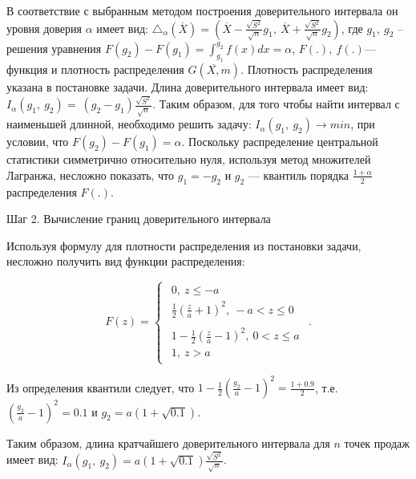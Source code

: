 \documentclass[addpoints, answers]{exam} %
\begin{document}
\begin{questions}
\begin{parts}
\begin{solution}
В соответствие с выбранным методом построения доверительного интервала он уровня доверия $\alpha $ имеет вид: ${\triangle }_{\alpha }\left(\overline{X}\right)=\left(\overline{X}-\frac{\sqrt{S^2}}{\sqrt{n}}g_1,\ \overline{X}+\frac{\sqrt{S^2}}{\sqrt{n}}g_2\right)$, где $g_1,\ g_2$ -- решения уравнения $F\left(g_2\right)-F\left(g_1\right)=\int^{g_2}_{g_1}{f\left(x\right)dx}=\alpha $, $F\left(.\right),\ f\left(.\right)$--- функция и плотность распределения $G\left(\overline{X,}m\right)$. Плотность распределения указана в постановке задачи. Длина доверительного интервала имеет вид:$I_{\alpha }\left(g_1,\ g_2\right)=\ \left(g_2-g_1\right)\frac{\sqrt{S^2}}{\sqrt{n}}$. Таким образом, для того чтобы найти интервал с наименьшей длинной, необходимо решить задачу: $I_{\alpha }\left(g_1,\ g_2\right)\to min$, при условии, что $F\left(g_2\right)-F\left(g_1\right)=\alpha $. Поскольку распределение центральной статистики симметрично относительно нуля, используя метод множителей Лагранжа, несложно показать, что  $g_1=-g_2$ и $g_2$ --- квантиль порядка $\frac{1+\alpha }{2}$ распределения $F\left(.\right)$.

Шаг 2. Вычисление границ доверительного интервала

Используя формулу для плотности распределения из постановки задачи, несложно получить вид функции распределения:

\[F\left(z\right)=\left\{ \begin{array}{c}
 \begin{array}{c}
0,\ z\le -a \\
\frac{1}{2}{\left(\frac{z}{a}+1\right)}^2,\ -a<z\le 0 \end{array}
 \\
 \begin{array}{c}
1-\frac{1}{2}{\left(\frac{z}{a}-1\right)}^2,\ 0<z\le a \\
1,\ z>a \end{array}
 \end{array}
\right..\]

Из определения квантили следует, что $1-\frac{1}{2}{\left(\frac{g_2}{a}-1\right)}^2=\frac{1+0.9}{2}$, т.е. ${\left(\frac{g_2}{a}-1\right)}^2=0.1$ и $g_2=a\left(1+\sqrt{0.1}\right)$.

Таким образом, длина кратчайшего доверительного интервала для $n$ точек продаж имеет вид: $I_{\alpha }\left(g_1,\ g_2\right)=a\left(1+\sqrt{0.1}\right)\frac{\sqrt{S^2}}{\sqrt{n}}$.





\end{solution}
\end{parts}
\end{questions}
\end{document}
